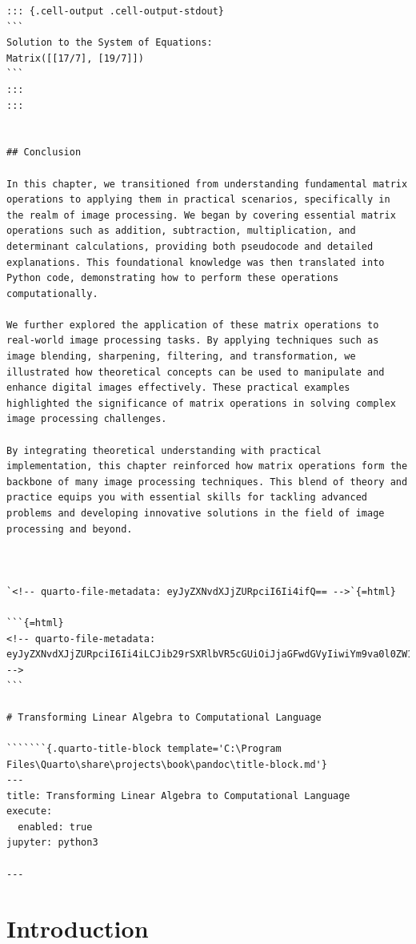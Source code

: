 \documentclass[
  letterpaper,
  DIV=11,
  numbers=noendperiod]{scrreprt}
\theoremstyle{plain}
\theoremstyle{definition}
\theoremstyle{remark}
\begin{document}
\begin{verbatim}
::: {.cell-output .cell-output-stdout}
```
Solution to the System of Equations:
Matrix([[17/7], [19/7]])
```
:::
:::


## Conclusion

In this chapter, we transitioned from understanding fundamental matrix operations to applying them in practical scenarios, specifically in the realm of image processing. We began by covering essential matrix operations such as addition, subtraction, multiplication, and determinant calculations, providing both pseudocode and detailed explanations. This foundational knowledge was then translated into Python code, demonstrating how to perform these operations computationally.

We further explored the application of these matrix operations to real-world image processing tasks. By applying techniques such as image blending, sharpening, filtering, and transformation, we illustrated how theoretical concepts can be used to manipulate and enhance digital images effectively. These practical examples highlighted the significance of matrix operations in solving complex image processing challenges.

By integrating theoretical understanding with practical implementation, this chapter reinforced how matrix operations form the backbone of many image processing techniques. This blend of theory and practice equips you with essential skills for tackling advanced problems and developing innovative solutions in the field of image processing and beyond.



`<!-- quarto-file-metadata: eyJyZXNvdXJjZURpciI6Ii4ifQ== -->`{=html}

```{=html}
<!-- quarto-file-metadata: eyJyZXNvdXJjZURpciI6Ii4iLCJib29rSXRlbVR5cGUiOiJjaGFwdGVyIiwiYm9va0l0ZW1OdW1iZXIiOjIsImJvb2tJdGVtRmlsZSI6Im1vZHVsZV8yLnFtZCIsImJvb2tJdGVtRGVwdGgiOjB9 -->
```

# Transforming Linear Algebra to Computational Language 

```````{.quarto-title-block template='C:\Program Files\Quarto\share\projects\book\pandoc\title-block.md'}
---
title: Transforming Linear Algebra to Computational Language
execute:
  enabled: true
jupyter: python3

---
\end{verbatim}

\section*{Introduction}\label{introduction}
\end{document}
